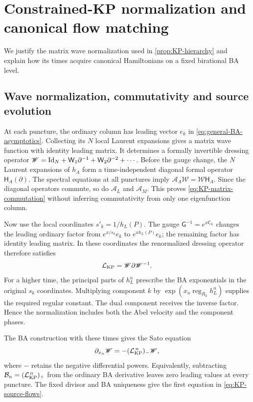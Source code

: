 \section{Constrained-KP normalization and canonical flow matching}
\label{app:KP-normalization}

We justify the matrix wave normalization used in
\cref{prop:KP-hierarchy} and explain how its times acquire canonical
Hamiltonians on a fixed birational BA level.

\subsection{Wave normalization, commutativity and source evolution}

At each puncture, the ordinary column has leading vector $e_k$ in
\cref{eq:general-BA-asymptotics}. Collecting its $N$ local Laurent
expansions gives a matrix wave function with identity leading matrix.
It determines a formally invertible dressing operator
$\mathscr W=\mathrm{Id}_N+\mathsf W_1\partial^{-1}+\mathsf W_2\partial^{-2}+\cdots$.
Before the gauge change, the $N$ Laurent expansions of $h_A$ form a
time-independent diagonal formal operator $\mathsf H_A(\partial)$.
The spectral equations at all punctures imply
$\mathcal A_A\mathscr W=\mathscr W\mathsf H_A$. Since the diagonal
operators commute, so do $\mathcal A_L$ and $\mathcal A_M$.
This proves \cref{eq:KP-matrix-commutation} without inferring
commutativity from only one eigenfunction column.

Now use the local coordinates $s'_k=1/h_L(P)$. The gauge
$\mathsf G^{-1}=e^{x\mathsf C_L}$ changes the leading ordinary
factor from $e^{x/s_k}e_k$ to $e^{xh_L(P)}e_k$; the remaining
factor has identity leading matrix. In these coordinates the
renormalized dressing operator therefore satisfies
\[
 \mathcal L_{\rm KP}=\mathscr W\partial\mathscr W^{-1}.
\]
For a higher time, the principal parts of $h_L^n$ prescribe the BA
exponentials in the original $s_k$ coordinates. Multiplying component
$k$ by $\exp(x_n\operatorname{reg}_{R_k}h_L^n)$ supplies the
required regular constant. The dual component receives the inverse
factor. Hence the normalization includes both the Abel velocity and
the component phases.

The BA construction with these times gives the Sato equation
\[
 \partial_{x_n}\mathscr W
 =-(\mathcal L_{\rm KP}^{\,n})_-\mathscr W,
\]
where $-$ retains the negative differential powers. Equivalently,
subtracting $\mathcal B_n=(\mathcal L_{\rm KP}^{\,n})_+$ from the
ordinary BA derivative leaves zero leading values at every puncture.
The fixed divisor and BA uniqueness give the first equation in
\cref{eq:KP-source-flows}.


